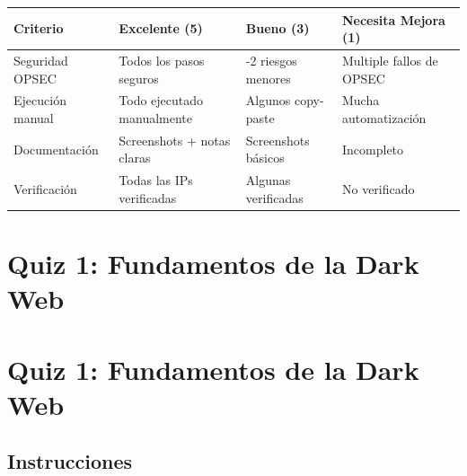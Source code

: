 \documentclass[
  letterpaper,
]{report}
\newcounter{none} %
\begin{document}
{\def\LTcaptype{none} %
\begin{longtable}[]{@{}
  >{\raggedright\arraybackslash}p{}
  >{\raggedright\arraybackslash}p{}
  >{\raggedright\arraybackslash}p{}
  >{\raggedright\arraybackslash}p{}@{}}
\toprule\noalign{}
\begin{minipage}[b]{\linewidth}\raggedright
Criterio
\end{minipage} & \begin{minipage}[b]{\linewidth}\raggedright
Excelente (5)
\end{minipage} & \begin{minipage}[b]{\linewidth}\raggedright
Bueno (3)
\end{minipage} & \begin{minipage}[b]{\linewidth}\raggedright
Necesita Mejora (1)
\end{minipage} \\
\midrule\noalign{}
\endhead
\bottomrule\noalign{}
\endlastfoot
Seguridad OPSEC & Todos los pasos seguros & 1-2 riesgos menores &
Multiple fallos de OPSEC \\
Ejecución manual & Todo ejecutado manualmente & Algunos copy-paste &
Mucha automatización \\
Documentación & Screenshots + notas claras & Screenshots básicos &
Incompleto \\
Verificación & Todas las IPs verificadas & Algunas verificadas & No
verificado \\
\end{longtable}
}

\chapter{Quiz 1: Fundamentos de la Dark
Web}\label{quiz-1-fundamentos-de-la-dark-web}

\chapter{Quiz 1: Fundamentos de la Dark
Web}\label{quiz-1-fundamentos-de-la-dark-web-1}

\section{Instrucciones}\label{instrucciones}
\end{document}
